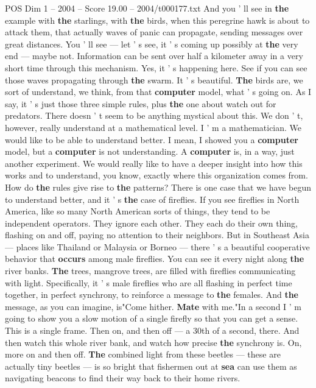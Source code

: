 \begin{textsample}{POS Dim 1 – 2004 – Score 19.00 – 2004/t000177.txt}
And you ' ll see in \textbf{the} example with \textbf{the} starlings, with \textbf{the} birds, when this peregrine hawk is about to attack them, that actually waves of panic can propagate, sending messages over great distances.
You ' ll see — let ' s see, it ' s coming up possibly at \textbf{the} very end — maybe not.
Information can be sent over half a kilometer away in a very short time through this mechanism.
Yes, it ' s happening here.
See if you can see those waves propagating through \textbf{the} swarm.
It ' s beautiful. \textbf{The} birds are, we sort of understand, we think, from that \textbf{computer} model, what ' s going on.
As I say, it ' s just those three simple rules, plus \textbf{the} one about watch out for predators.
There doesn ' t seem to be anything mystical about this.
We don ' t, however, really understand at a mathematical level.
I ' m a mathematician.
We would like to be able to understand better.
I mean, I showed you a \textbf{computer} model, but a \textbf{computer} is not understanding.
A \textbf{computer} is, in a way, just another experiment.
We would really like to have a deeper insight into how this works and to understand, you know, exactly where this organization comes from.
How do \textbf{the} rules give rise to \textbf{the} patterns?
There is one case that we have begun to understand better, and it ' s \textbf{the} case of fireflies.
If you see fireflies in North America, like so many North American sorts of things, they tend to be independent operators.
They ignore each other.
They each do their own thing, flashing on and off, paying no attention to their neighbors.
But in Southeast Asia — places like Thailand or Malaysia or Borneo — there ' s a beautiful cooperative behavior that \textbf{occurs} among male fireflies.
You can see it every night along \textbf{the} river banks. \textbf{The} trees, mangrove trees, are filled with fireflies communicating with light.
Specifically, it ' s male fireflies who are all flashing in perfect time together, in perfect synchrony, to reinforce a message to \textbf{the} females.
And \textbf{the} message, as you can imagine, is"Come hither. \textbf{Mate} with me."In a second I ' m going to show you a slow motion of a single firefly so that you can get a sense.
This is a single frame.
Then on, and then off — a 30th of a second, there.
And then watch this whole river bank, and watch how precise \textbf{the} synchrony is.
On, more on and then off. \textbf{The} combined light from these beetles — these are actually tiny beetles — is so bright that fishermen out at \textbf{sea} can use them as navigating beacons to find their way back to their home rivers.

\end{textsample}

